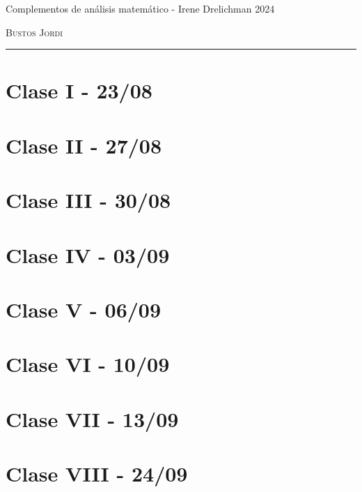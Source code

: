 \documentclass[12pt,a4paper]{book}
\begin{document}
\renewcommand{\contentsname}{\vspace{0cm} Contenido \vspace{-2cm}}

\begin{titlepage}
\vspace*{2cm}

\noindent
\vspace*{0.5cm}

\vspace{1.5cm}
\epigraph{Complementos de análisis matemático - Irene Drelichman 2024}%
{ \textsc{Bustos Jordi}}
\null\vfill
\vspace*{1cm}
\noindent
\hfill
\begin{minipage}{0.7\linewidth}
    \begin{flushright}
        \printauthor
    \end{flushright}
\end{minipage}
%
\begin{minipage}{0.02\linewidth}
    \rule{1pt}{70pt}
\end{minipage}
\titlepagedecoration
\end{titlepage}

\let\cleardoublepage=\clearpage
\tableofcontents
\blankpage

\chapter{Clase I - 23/08 }

\newpage\thispagestyle{empty}\blankpage
\chapter{Clase II - 27/08}

\newpage\thispagestyle{empty}\blankpage
\chapter{Clase III - 30/08}

\newpage\thispagestyle{empty}\blankpage
\chapter{Clase IV - 03/09}

\newpage\thispagestyle{empty}\blankpage
\chapter{Clase V - 06/09}

\newpage\thispagestyle{empty}\blankpage
\chapter{Clase VI - 10/09}

\newpage\thispagestyle{empty}\blankpage
\chapter{Clase VII - 13/09}

\newpage\thispagestyle{empty}\blankpage
\chapter{Clase VIII - 24/09}


\blankpage



\nocite{*}
\end{document}
